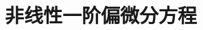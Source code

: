 \documentclass[../main.tex]{subfiles}
\begin{document}
\chapter{非线性一阶偏微分方程}\label{chapter:ch03}







\end{document}
